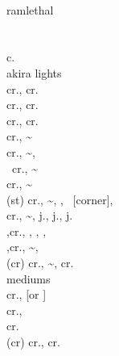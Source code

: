 \documentclass[a4paper,9pt,twocolumn]{letter}
\begin{document}
\sffamily

\noindent
\anypunch\lpunch\mpunch\hpunch\allpunch\expunch \\
\anykick\lkick\mkick\hkick\allkick\exkick \\
\vsone\vstwo\vtone\vttwo \\
\cancel\crush\air\mash \\
\btnp\btnk\btns\btnhs\btnd\bluerc\purplerc\yellowrc\redrc \\
\btnl\btnm\btnh\btnsp \\

\noindent
ramlethal \\
\two\btnk\link\two\btnd\link\npdp\btnp \\
\two\btnk\link\two\btnd\link\npqcb\btnp\,\npqcb\btnp\,\npqcb\btnp \\
c.\btns\link\two\btnhs\link\npdp\btnp\link\five\btnk\link\six\btnhs\link\npqcb\btnk \\

\smallbreak
\noindent
akira lights \\
cr.\lkick, cr.\lpunch\cancel\qcb\lpunch \\
cr.\lkick, cr.\lpunch\cancel\dragonpunch\hkick \\
cr.\lkick, cr.\lpunch\cancel\qcb\expunch \\
cr.\lpunch, \lpunch\~\mpunch\cancel\dragonpunch\hkick \\
cr.\lpunch, \lpunch\~\mpunch\cancel\qcb\mkick,\lkick \\\
cr.\lpunch, \lpunch\~\mpunch\cancel\qcb\hpunch \\
cr.\lpunch, \lpunch\~\mpunch\cancel\vstwo \\
(st) cr.\lpunch, \lpunch\~\mpunch\cancel\qcb\hkick, \hkick, \qcb\expunch\ [corner], \dragonpunch\exkick \\
cr.\lpunch, \lpunch\~\mpunch\cancel\vstwo\cancel\up, j.\lpunch, j.\mpunch, j. \\
\vsone,cr.\lpunch, \lpunch\mkick\cancel\qcb\hkick, \hkick, \qcf\expunch, \qcf\hpunch \\
\vsone,cr.\lpunch, \lpunch\~\mpunch\cancel\qcf\expunch, \dragonpunch\hkick \\
(cr) cr.\lpunch, \lpunch\~\mpunch\cancel\qcb\mpunch, cr.\lpunch\cancel\dragonpunch\hkick \\

\smallbreak
\noindent
mediums \\
cr.\mkick\cancel\qcb\lkick, [\lkick or \mkick] \\
cr.\mkick\cancel\qcb\exkick,\dragonpunch\hkick \\
cr.\mkick\cancel\dragonpunch\hkick \\
(cr) cr.\mkick\cancel\qcb\mpunch, cr.\lpunch\cancel\dragonpunch\hkick \\
\end{document}
